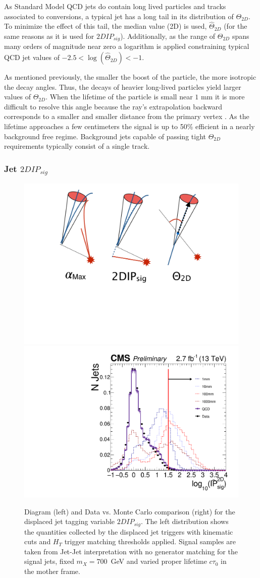 As Standard Model QCD jets do contain long lived particles and tracks associated to conversions,
a typical jet has a  long tail in its distribution of $\Theta_{2D}$. To minimize the effect of this tail, the median value (2D) is used, $\hat{\Theta}_{2D}$ (for the same reasons as it is used for $2DIP_{sig}$). Additionally, as the range of $\Theta_{2D}$ spans many orders of magnitude near zero a logarithm is 
applied constraining typical QCD jet values of $-2.5 <\log(\hat{\Theta}_{2D}) < -1$. 

As mentioned previously, the smaller the boost of the particle, the more isotropic the decay angles. Thus, the decays of heavier long-lived particles
 yield larger values of $\Theta_{2D}$. When the lifetime of the particle is small near $1$ mm it is more difficult to resolve this angle because the
ray's extrapolation backward corresponds to a smaller and smaller distance from the primary vertex .
 As the lifetime approaches a few centimeters the signal is up to 50\% efficient in a nearly background free regime. Background jets capable of passing
tight $\Theta_{2D}$ requirements typically consist of a single track. 

\subsubsection{Jet $2DIP_{sig}$}

\begin{figure}
\begin{center}
\includegraphics[width=.2\textwidth]{figures/pas/DIAGRAMS/ip_diag.pdf}
\includegraphics[width=.5\textwidth]{figures/pas/SELECTION/76x_pu/DJET_ipsig2d.pdf}
\caption{Diagram (left) and Data vs. Monte Carlo comparison (right) for the displaced jet tagging variable $2DIP_{sig}$. 
The left distribution  shows the quantities collected by the displaced jet triggers with kinematic cuts and $H_T$ trigger
 matching thresholds applied. Signal samples are taken from Jet-Jet interpretation with no generator matching for the signal
 jets, fixed $m_X=700$~GeV and varied proper lifetime $c\tau_0$ in the mother frame. 
 \label{fig:2dipsig}}
\end{center}
\end{figure}

